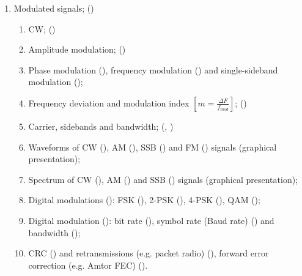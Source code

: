 \begin{flushleft}
\begin{enumerate}
\begin{enumerate}
\item Modulated signals; ()\label{HAREC.a.1.8}
\begin{enumerate}
\item CW; ()\label{HAREC.a.1.8.1}
\item Amplitude modulation; ()\label{HAREC.a.1.8.2}
\item Phase modulation ()\label{HAREC.a.1.8.3a},
  frequency modulation ()\label{HAREC.a.1.8.3b}
  and single-sideband modulation ()\label{HAREC.a.1.8.3c};
\item Frequency deviation and modulation index
  \(\left[m = \frac{\Delta F}{f_{mod}}\right]\);
  ()\label{HAREC.a.1.8.4}
\item Carrier, sidebands and bandwidth;
  (, )\label{HAREC.a.1.8.5}
\item Waveforms of CW ()\label{HAREC.a.1.8.6a},
  AM ()\label{HAREC.a.1.8.6b},
  SSB ()\label{HAREC.a.1.8.6c}
  and FM ()\label{HAREC.a.1.8.6d}
  signals (graphical presentation);
\item Spectrum of CW ()\label{HAREC.a.1.8.7a},
  AM ()\label{HAREC.a.1.8.7b}
  and SSB ()\label{HAREC.a.1.8.7c}
  signals (graphical presentation);
\item Digital modulations ()\label{HAREC.a.1.8.8}:
  FSK ()\label{HAREC.a.1.8.8a},
  2-PSK ()\label{HAREC.a.1.8.8b},
  4-PSK ()\label{HAREC.a.1.8.8c},
  QAM ()\label{HAREC.a.1.8.8d};
\item Digital modulation ()\label{HAREC.a.1.8.9}:
  bit rate ()\label{HAREC.a.1.8.9a},
  symbol rate (Baud rate) ()\label{HAREC.a.1.8.9b}
  and bandwidth ()\label{HAREC.a.1.8.9c};
\item CRC ()\label{HAREC.a.1.8.10a}
  and retransmissions (e.g. packet radio)
  ()\label{HAREC.a.1.8.10b},
  forward error correction (e.g. Amtor FEC)
  ()\label{HAREC.a.1.8.10c}.
\end{enumerate}


\end{enumerate}
\end{enumerate}
\end{flushleft}
